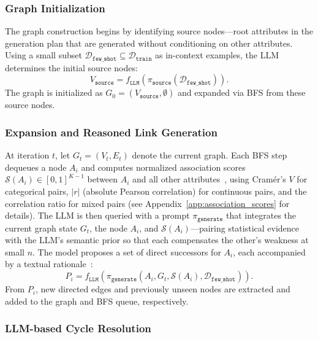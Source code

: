 \subsubsection{Graph Initialization}
The graph construction begins by identifying source nodes---root attributes in the generation plan that are generated without conditioning on other attributes. Using a small subset $\mathcal{D}_{\mathtt{few\_shot}} \subseteq \mathcal{D}_{\mathtt{train}}$ as in-context examples, the LLM determines the initial source nodes:
\begin{equation}
    V_{\mathtt{source}} = f_{\mathtt{LLM}}(\pi_{\mathtt{source}} ( \mathcal{D}_{\mathtt{few\_shot}})) .
\end{equation}
The graph is initialized as $G_0 = (V_{\mathtt{source}}, \emptyset)$ and expanded via BFS from these source nodes.

\subsubsection{Expansion and Reasoned Link Generation}

At iteration $t$, let $G_t = (V_t, E_t)$ denote the current graph. Each BFS step dequeues a node $A_i$ and computes normalized association scores $\mathcal{S}(A_i) \in [0,1]^{K-1}$ between $A_i$ and all other attributes~\cite{agresti2011categorical}, using Cram\'{e}r's $V$ for categorical pairs, $|r|$ (absolute Pearson correlation) for continuous pairs, and the correlation ratio for mixed pairs (see Appendix~\ref{app:association_scores} for details).
The LLM is then queried with a prompt $\pi_{\mathtt{generate}}$ that integrates the current graph state $G_t$, the node $A_i$, and $\mathcal{S}(A_i)$---pairing statistical evidence with the LLM's semantic prior so that each compensates the other's weakness at small $n$. The model proposes a set of direct successors for $A_i$, each accompanied by a textual rationale~\cite{liu-etal-2024-unleashing-power}:
\begin{equation}
    P_i = f_{\mathtt{LLM}}(\pi_{\mathtt{generate}}(A_i, G_t, \mathcal{S}(A_i), \mathcal{D}_{\mathtt{few\_shot}})).
\end{equation}
From $P_i$, new directed edges and previously unseen nodes are extracted and added to the graph and BFS queue, respectively.

\subsubsection{LLM-based Cycle Resolution}

